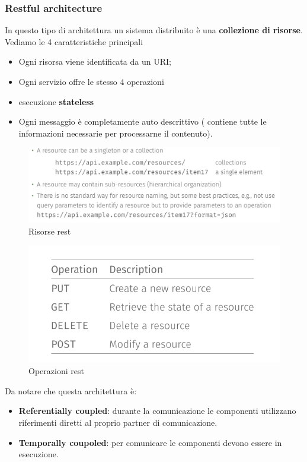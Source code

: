 \documentclass[12pt]{article}
\begin{document}
 	\subsubsection{Restful architecture}
 		In questo tipo di architettura un sistema distribuito è una \textbf{collezione di risorse}. Vediamo le 4 caratteristiche principali
 		\begin{itemize}
 			\item Ogni risorsa viene identificata da un URI;
 			\item Ogni servizio offre le stesso 4 operazioni
 			\item esecuzione \textbf{stateless}
 			\item Ogni messaggio è completamente auto descrittivo ( contiene tutte le informazioni necessarie per processarne il contenuto).
 		\end{itemize}
 		\begin{figure}[h!]
 			\centering
 			\includegraphics[scale=0.40]{img/rest.png}
 			\caption{Risorse rest}
 		\end{figure}
 		\begin{figure}[h!]
 			\centering
 			\includegraphics[scale=0.40]{img/rest1.png}
 			\caption{Operazioni rest}
 		\end{figure}
 		Da notare che questa architettura è:
 		\begin{itemize}
 			\item \textbf{Referentially coupled}: durante la comunicazione le componenti utilizzano riferimenti diretti al proprio partner di comunicazione.
 			\item \textbf{Temporally coupoled}: per comunicare le componenti devono essere in esecuzione.
 		\end{itemize}
\end{document}
